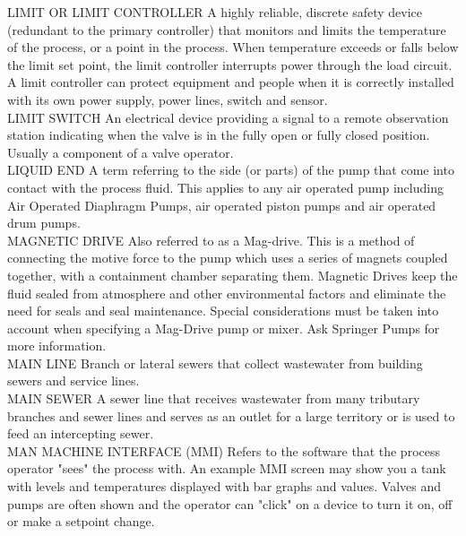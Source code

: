 LIMIT OR LIMIT CONTROLLER
A highly reliable, discrete safety device (redundant to the primary controller) that monitors and limits the temperature of the process, or a point in the process. When temperature exceeds or falls below the limit set point, the limit controller interrupts power through the load circuit. A limit controller can protect equipment and people when it is correctly installed with its own power supply, power lines, switch and sensor.
\vspace{0.3cm}\\

LIMIT SWITCH
An electrical device providing a signal to a remote observation station indicating when the valve is in the fully open or fully closed position. Usually a component of a valve operator.
\vspace{0.3cm}\\
LIQUID END
A term referring to the side (or parts) of the pump that come into contact with the process fluid. This applies to any air operated pump including Air Operated Diaphragm Pumps, air operated piston pumps and air operated drum pumps.
\vspace{0.3cm}\\
MAGNETIC DRIVE
Also referred to as a Mag-drive. This is a method of connecting the motive force to the pump which uses a series of magnets coupled together, with a containment chamber separating them. Magnetic Drives keep the fluid sealed from atmosphere and other environmental factors and eliminate the need for seals and seal maintenance. Special considerations must be taken into account when specifying a Mag-Drive pump or mixer. Ask Springer Pumps for more information.
\vspace{0.3cm}\\
MAIN LINE
Branch or lateral sewers that collect wastewater from building sewers and service lines. 
\vspace{0.3cm}\\
MAIN SEWER
A sewer line that receives wastewater from many tributary branches and sewer lines and serves as an outlet for a large territory or is used to feed an intercepting sewer. 
\vspace{0.3cm}\\
MAN MACHINE INTERFACE (MMI)
Refers to the software that the process operator "sees" the process with. An example MMI screen may show you a tank with levels and temperatures displayed with bar graphs and values. Valves and pumps are often shown and the operator can "click" on a device to turn it on, off or make a setpoint change.
\vspace{0.3cm}\\

